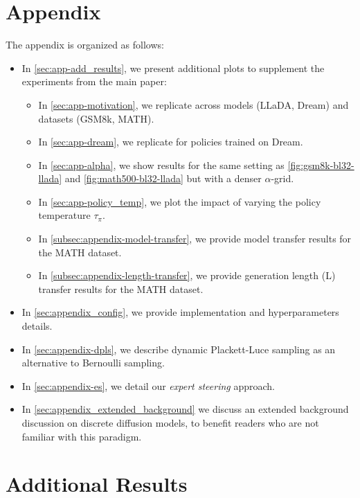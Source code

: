 \section*{Appendix}
The appendix is organized as follows:
\begin{itemize}
\item In \autoref{sec:app-add_results}, we present additional plots to supplement the experiments from the main paper:
\begin{itemize}
    \item In \ref{sec:app-motivation}, we replicate  across models (LLaDA, Dream) and datasets (GSM8k, MATH).
    \item In \ref{sec:app-dream}, we replicate  for policies trained on Dream.
    \item In \ref{sec:app-alpha}, we show results for the same setting as \autoref{fig:gsm8k-bl32-llada} and \autoref{fig:math500-bl32-llada} but with a denser $\alpha$-grid.
    \item In \ref{sec:app-policy_temp}, we plot the impact of varying the policy temperature $\tau_{\pi}$.
    \item In \ref{subsec:appendix-model-transfer}, we provide model transfer results for the MATH dataset.
    \item In \ref{subsec:appendix-length-transfer}, we provide generation length (L) transfer results for the MATH dataset.
 \end{itemize}
\item In \autoref{sec:appendix_config}, we  provide implementation and hyperparameters details.
\item In \autoref{sec:appendix-dpls}, we describe dynamic Plackett-Luce sampling as an alternative to Bernoulli sampling.
\item In \autoref{sec:appendix-es}, we detail our \emph{expert steering} approach.
\item In \autoref{sec:appendix_extended_background} we discuss an extended background discussion on discrete diffusion models, to benefit readers who are not familiar with this paradigm.

\end{itemize}

\newpage

\section{Additional Results}
\label{sec:app-add_results}

